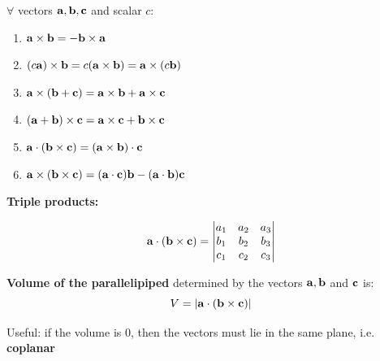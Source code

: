 \documentclass{report}
\begin{document}
\begin{tcolorbox}[colback=red!5!white, colframe=red!75!black, title=Properties of the Cross Product]
$\forall$ vectors $\mathbf{a}, \mathbf{b}, \mathbf{c}$ and scalar $c$:
\begin{enumerate}
    \item $\mathbf{a} \times \mathbf{b} = - \mathbf{b} \times \mathbf{a}$
    \item $(c \mathbf{a}) \times \mathbf{b} = c(\mathbf{a} \times \mathbf{b}) = \mathbf{a} \times (c \mathbf{b})$
    \item $\mathbf{a} \times (\mathbf{b} + \mathbf{c}) = \mathbf{a} \times \mathbf{b} + \mathbf{a} \times \mathbf{c}$
    \item $(\mathbf{a} + \mathbf{b}) \times \mathbf{c} = \mathbf{a} \times \mathbf{c} + \mathbf{b} \times \mathbf{c}$
    \item $\mathbf{a} \cdot (\mathbf{b} \times \mathbf{c}) = (\mathbf{a} \times \mathbf{b}) \cdot \mathbf{c}$
    \item $\mathbf{a} \times (\mathbf{b} \times \mathbf{c}) = (\mathbf{a} \cdot \mathbf{c}) \mathbf{b} - (\mathbf{a} \cdot \mathbf{b}) \mathbf{c}$
\end{enumerate}
\end{tcolorbox}

\textbf{Triple products:}

\[\mathbf{a} \cdot (\mathbf{b} \times \mathbf{c}) = \begin{vmatrix}
    a_1 & a_2 & a_3 \\
    b_1 & b_2 & b_3 \\
    c_1 & c_2 & c_3 \\
\end{vmatrix}\]


\textbf{Volume of the parallelipiped} determined by the vectors $\mathbf{a}, \mathbf{b}$ and $\mathbf{c}$
is:
\[V = |\mathbf{a} \cdot (\mathbf{b} \times \mathbf{c})|\]

Useful: if the volume is 0, then the vectors must lie in the same plane, i.e. \textbf{coplanar}
\end{document}
